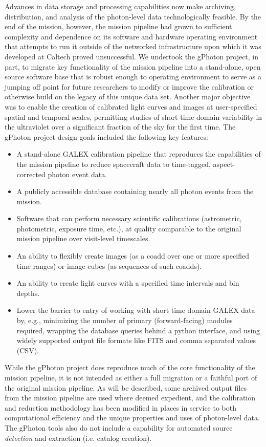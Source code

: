 \documentclass[preprint]{aastex}
\begin{document}
Advances in data storage and processing capabilities now make archiving, distribution, and analysis of the photon-level data technologically feasible. By the end of the mission, however, the mission pipeline had grown to sufficient complexity and dependence on its software and hardware operating environment that attempts to run it outside of the networked infrastructure upon which it was developed at Caltech proved unsuccessful. We undertook the gPhoton project, in part, to migrate key functionality of the mission pipeline into a stand-alone, open source software base that is robust enough to operating environment to serve as a jumping off point for future researchers to modify or improve the calibration or otherwise build on the legacy of this unique data set. Another major objective was to enable the creation of calibrated light curves and images at user-specified spatial and temporal scales, permitting studies of short time-domain variability in the ultraviolet over a significant fraction of the sky for the first time. The gPhoton project design goals included the following key features:
\begin{itemize}
\item{A stand-alone GALEX calibration pipeline that reproduces the capabilities of the mission pipeline to reduce spacecraft data to time-tagged, aspect-corrected photon event data.}
\item{A publicly accessible database containing nearly all photon events from the mission.}
\item{Software that can perform necessary scientific calibrations (astrometric, photometric, exposure time, etc.), at quality comparable to the original mission pipeline over visit-level timescales.}
\item{An ability to flexibly create images (as a coadd over one or more specified time ranges) or image cubes (as sequences of such coadds).}
\item{An ability to create light curves with a specified time intervals and bin depths.}
\item{Lower the barrier to entry of working with short time domain GALEX data by, e.g., minimizing the number of primary (forward-facing) modules required, wrapping the database queries behind a python interface, and using widely supported output file formats like FITS and comma separated values (CSV).}
\end{itemize}

While the gPhoton project does reproduce much of the core functionality of the mission pipeline, it is not intended as either a full migration or a faithful port of the original mission pipeline. As will be described, some archived output files from the mission pipeline are used where deemed expedient, and the calibration and reduction methodology has been modified in places in service to both computational efficiency and the unique properties and uses of photon-level data. The gPhoton tools also do not include a capability for automated source \emph{detection} and extraction (i.e. catalog creation).
\end{document}
